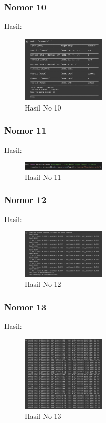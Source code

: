 \subsubsection{Nomor 10}
\hfill\break

Hasil:
\begin{figure}[H]
\centering
	\includegraphics[width=4cm]{figures/1174066/7/no10.jpg}
	\caption{Hasil No 10}
\end{figure}

\subsubsection{Nomor 11}
\hfill\break

Hasil:
\begin{figure}[H]
\centering
	\includegraphics[width=4cm]{figures/1174066/7/no11.jpg}
	\caption{Hasil No 11}
\end{figure}

\subsubsection{Nomor 12}
\hfill\break

Hasil:
\begin{figure}[H]
\centering
	\includegraphics[width=4cm]{figures/1174066/7/no12.jpg}
	\caption{Hasil No 12}
\end{figure}

\subsubsection{Nomor 13}
\hfill\break

Hasil:
\begin{figure}[H]
\centering
	\includegraphics[width=4cm]{figures/1174066/7/no13.jpg}
	\caption{Hasil No 13}
\end{figure}

